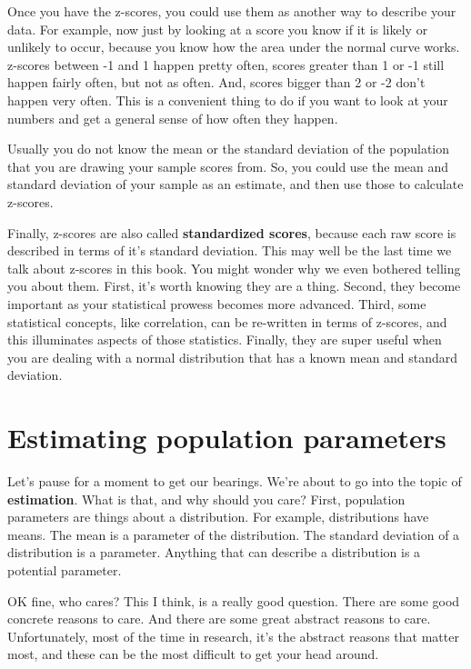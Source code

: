 \documentclass[
  letterpaper,
  DIV=11,
  numbers=noendperiod]{scrreprt}
\begin{document}
Once you have the z-scores, you could use them as another way to
describe your data. For example, now just by looking at a score you know
if it is likely or unlikely to occur, because you know how the area
under the normal curve works. z-scores between -1 and 1 happen pretty
often, scores greater than 1 or -1 still happen fairly often, but not as
often. And, scores bigger than 2 or -2 don't happen very often. This is
a convenient thing to do if you want to look at your numbers and get a
general sense of how often they happen.

Usually you do not know the mean or the standard deviation of the
population that you are drawing your sample scores from. So, you could
use the mean and standard deviation of your sample as an estimate, and
then use those to calculate z-scores.

Finally, z-scores are also called \textbf{standardized scores}, because
each raw score is described in terms of it's standard deviation. This
may well be the last time we talk about z-scores in this book. You might
wonder why we even bothered telling you about them. First, it's worth
knowing they are a thing. Second, they become important as your
statistical prowess becomes more advanced. Third, some statistical
concepts, like correlation, can be re-written in terms of z-scores, and
this illuminates aspects of those statistics. Finally, they are super
useful when you are dealing with a normal distribution that has a known
mean and standard deviation.

\section{Estimating population
parameters}\label{estimating-population-parameters}

Let's pause for a moment to get our bearings. We're about to go into the
topic of \textbf{estimation}. What is that, and why should you care?
First, population parameters are things about a distribution. For
example, distributions have means. The mean is a parameter of the
distribution. The standard deviation of a distribution is a parameter.
Anything that can describe a distribution is a potential parameter.

OK fine, who cares? This I think, is a really good question. There are
some good concrete reasons to care. And there are some great abstract
reasons to care. Unfortunately, most of the time in research, it's the
abstract reasons that matter most, and these can be the most difficult
to get your head around.
\end{document}
